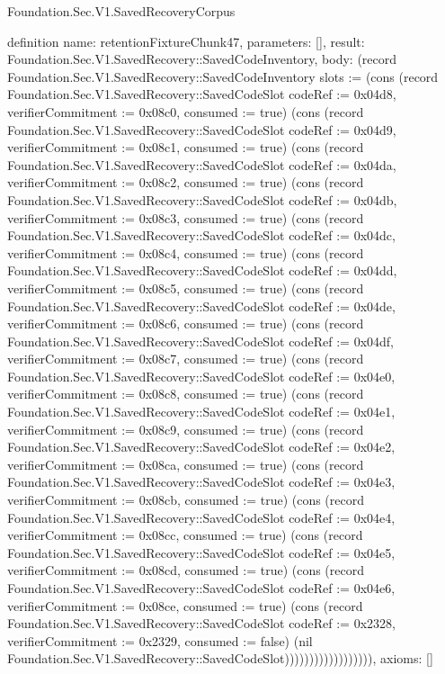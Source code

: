 \begin{lexlean}{Foundation.Sec.V1.SavedRecoveryCorpus}
\begin{semanticmodule}
definition{
  name: retentionFixtureChunk47,
  parameters: [],
  result: Foundation.Sec.V1.SavedRecovery::SavedCodeInventory,
  body: (record Foundation.Sec.V1.SavedRecovery::SavedCodeInventory {slots := (cons (record Foundation.Sec.V1.SavedRecovery::SavedCodeSlot {codeRef := 0x04d8, verifierCommitment := 0x08c0, consumed := true}) (cons (record Foundation.Sec.V1.SavedRecovery::SavedCodeSlot {codeRef := 0x04d9, verifierCommitment := 0x08c1, consumed := true}) (cons (record Foundation.Sec.V1.SavedRecovery::SavedCodeSlot {codeRef := 0x04da, verifierCommitment := 0x08c2, consumed := true}) (cons (record Foundation.Sec.V1.SavedRecovery::SavedCodeSlot {codeRef := 0x04db, verifierCommitment := 0x08c3, consumed := true}) (cons (record Foundation.Sec.V1.SavedRecovery::SavedCodeSlot {codeRef := 0x04dc, verifierCommitment := 0x08c4, consumed := true}) (cons (record Foundation.Sec.V1.SavedRecovery::SavedCodeSlot {codeRef := 0x04dd, verifierCommitment := 0x08c5, consumed := true}) (cons (record Foundation.Sec.V1.SavedRecovery::SavedCodeSlot {codeRef := 0x04de, verifierCommitment := 0x08c6, consumed := true}) (cons (record Foundation.Sec.V1.SavedRecovery::SavedCodeSlot {codeRef := 0x04df, verifierCommitment := 0x08c7, consumed := true}) (cons (record Foundation.Sec.V1.SavedRecovery::SavedCodeSlot {codeRef := 0x04e0, verifierCommitment := 0x08c8, consumed := true}) (cons (record Foundation.Sec.V1.SavedRecovery::SavedCodeSlot {codeRef := 0x04e1, verifierCommitment := 0x08c9, consumed := true}) (cons (record Foundation.Sec.V1.SavedRecovery::SavedCodeSlot {codeRef := 0x04e2, verifierCommitment := 0x08ca, consumed := true}) (cons (record Foundation.Sec.V1.SavedRecovery::SavedCodeSlot {codeRef := 0x04e3, verifierCommitment := 0x08cb, consumed := true}) (cons (record Foundation.Sec.V1.SavedRecovery::SavedCodeSlot {codeRef := 0x04e4, verifierCommitment := 0x08cc, consumed := true}) (cons (record Foundation.Sec.V1.SavedRecovery::SavedCodeSlot {codeRef := 0x04e5, verifierCommitment := 0x08cd, consumed := true}) (cons (record Foundation.Sec.V1.SavedRecovery::SavedCodeSlot {codeRef := 0x04e6, verifierCommitment := 0x08ce, consumed := true}) (cons (record Foundation.Sec.V1.SavedRecovery::SavedCodeSlot {codeRef := 0x2328, verifierCommitment := 0x2329, consumed := false}) (nil Foundation.Sec.V1.SavedRecovery::SavedCodeSlot)))))))))))))))))}),
  axioms: []
}


\end{semanticmodule}
\end{lexlean}
